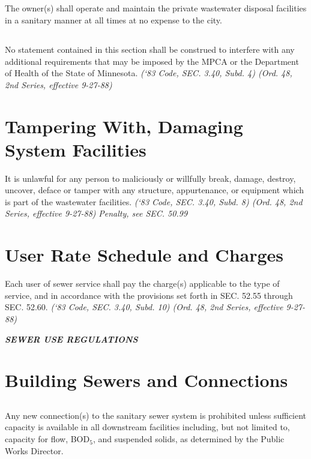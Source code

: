 \documentclass[code.tex]{subfiles}
\begin{document}
\subsection{}
The owner(s) shall operate and maintain the private wastewater disposal facilities in a sanitary manner at all times at no expense to the city.
\subsection{}
No statement contained in this section shall be construed to interfere with any additional requirements that may be imposed by the MPCA or the Department of Health of the State of Minnesota.\newline
\emph{(‘83 Code, SEC. 3.40, Subd. 4) (Ord. 48, 2nd Series, effective 9-27-88)}
\section{Tampering With, Damaging System Facilities}
It is unlawful for any person to maliciously or willfully break, damage, destroy, uncover, deface or tamper with any structure, appurtenance, or equipment which is part of the wastewater facilities.\newline
\emph{(‘83 Code, SEC. 3.40, Subd. 8) (Ord. 48, 2nd Series, effective 9-27-88)}\newline
\emph{Penalty, see SEC. 50.99}
\section{User Rate Schedule and Charges}
Each user of sewer service shall pay the charge(s) applicable to the type of service, and in accordance with the provisions set forth in SEC. 52.55 through SEC. 52.60.\newline
\emph{(‘83 Code, SEC. 3.40, Subd. 10) (Ord. 48, 2nd Series, effective 9-27-88)}\newline


\begin{center}
\emph{\textbf{\LARGE{SEWER USE REGULATIONS}}}
\end{center}

\setcounter{section}{14}
\section{Building Sewers and Connections}
\subsection{}
Any new connection(s) to the sanitary sewer system is prohibited unless sufficient capacity is available in all downstream facilities including, but not limited to, capacity for flow, BOD$_{5}$, and suspended solids, as determined by the Public Works Director.
\end{document}
